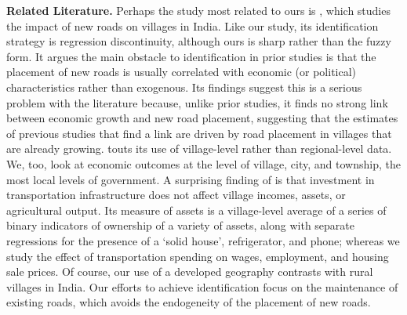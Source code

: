 {\bf Related Literature.} Perhaps the study most related to ours is \cite{asher2020}, which studies the impact of new roads on villages in India. Like our study, its identification strategy is regression discontinuity, although ours is sharp rather than the fuzzy form.  It argues the main obstacle to identification in prior studies is that the placement of new roads is usually correlated with economic (or political) characteristics rather than exogenous. Its findings suggest this is a serious problem with the literature because, unlike prior studies, it finds no strong link between economic growth and new road placement, suggesting that the estimates of previous studies that find a link are driven by road placement in villages that are already growing. \cite{asher2020} touts its use of village-level rather than regional-level data.  We, too, look at economic outcomes at the level of village, city, and township, the most local levels of government.  A surprising finding of \cite{asher2020} is that investment in transportation infrastructure does not affect village incomes, assets, or agricultural output.  Its measure of assets is a village-level average of a series of binary indicators of ownership of a variety of assets, along with separate regressions for the presence of a ‘solid house’, refrigerator, and phone; whereas we study the effect of transportation spending on wages, employment, and housing sale prices.  Of course, our use of a developed geography contrasts with rural villages in India.  Our efforts to achieve identification focus on the maintenance of existing roads, which avoids the endogeneity of the placement of new roads.




